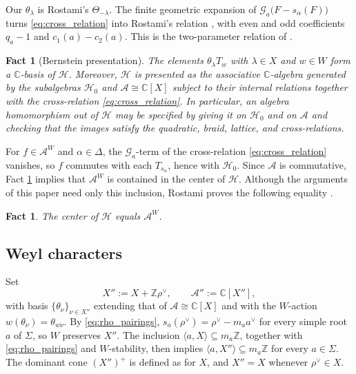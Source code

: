 \documentclass[12pt]{article}
\numberwithin{equation}{section}
\newtheorem{fact}[theorem]{Fact}
\theoremstyle{definition}
\theoremstyle{remark}
\theoremstyle{plain}
\begin{document}
Our $\theta_\lambda$ is Rostami's $\Theta_{-\lambda}$. The finite geometric expansion of $\mathcal{G}_a\big(F-s_\alpha(F)\big)$ turns \eqref{eq:cross_relation} into Rostami's relation \cite[Section 5.4]{Rostami}, with even and odd coefficients $q_a-1$ and $c_1(a)-c_2(a)$. This is the two-parameter relation of \cite[Proposition 3.6]{Lus89}.

\begin{fact}[Bernstein presentation]\label{fact:bernstein}
The elements $\theta_\lambda T_w$ with $\lambda \in X$ and $w \in W$ form a $\mathbb{C}$-basis of $\mathcal{H}$. Moreover, $\mathcal{H}$ is presented as the associative $\mathbb{C}$-algebra generated by the subalgebras $\mathcal{H}_0$ and $\mathcal{A} \cong \mathbb{C}[X]$ subject to their internal relations together with the cross-relation \eqref{eq:cross_relation}. In particular, an algebra homomorphism out of $\mathcal{H}$ may be specified by giving it on $\mathcal{H}_0$ and on $\mathcal{A}$ and checking that the images satisfy the quadratic, braid, lattice, and cross-relations.
\end{fact}

For $f \in \mathcal{A}^W$ and $\alpha \in \Delta$, the $\mathcal{G}_a$-term of the cross-relation \eqref{eq:cross_relation} vanishes, so $f$ commutes with each $T_{s_\alpha}$, hence with $\mathcal{H}_0$. Since $\mathcal{A}$ is commutative, Fact \ref{fact:bernstein} implies that $\mathcal{A}^W$ is contained in the center of $\mathcal{H}$. Although the arguments of this paper need only this inclusion, Rostami proves the following equality \cite{Rostami}.

\begin{fact}\label{fact:center}
The center of $\mathcal{H}$ equals $\mathcal{A}^W$.
\end{fact}


\subsection{Weyl characters}\label{subsec:chV}

Set
$$X'' := X + \mathbb{Z}\rho^\vee, \qquad \mathcal{A}'' := \mathbb{C}[X''],$$
with basis $\{\theta_\nu\}_{\nu\in X''}$ extending that of $\mathcal{A} \cong \mathbb{C}[X]$ and with the $W$-action $w(\theta_\nu) = \theta_{w\nu}$. By \eqref{eq:rho_pairings}, $s_a(\rho^\vee) = \rho^\vee - m_a a^\vee$ for every simple root $a$ of $\Sigma$, so $W$ preserves $X''$. The inclusion $\langle a,X\rangle\subseteq m_a\mathbb{Z}$, together with \eqref{eq:rho_pairings} and $W$-stability, then implies $\langle a, X''\rangle \subseteq m_a\mathbb{Z}$ for every $a \in \Sigma$. The dominant cone $(X'')^+$ is defined as for $X$, and $X'' = X$ whenever $\rho^\vee \in X$.
\end{document}

